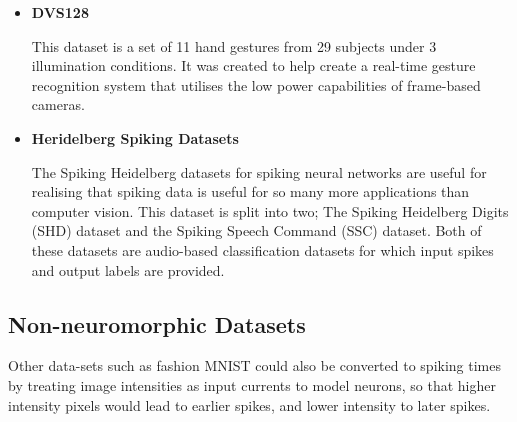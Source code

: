 \begin{itemize}
      \item \textbf{DVS128}

            This dataset is a set of 11 hand gestures from 29 subjects under 3 illumination conditions. It was created to help create a real-time gesture recognition system that utilises the low power capabilities of frame-based cameras\cite{DVS128}.
      \item \textbf{Heridelberg Spiking Datasets}

            The Spiking Heidelberg datasets for spiking neural networks\cite{SpikingHeidelberg} are useful for realising that spiking data is useful for so many more applications than computer vision. This dataset is split into two; The Spiking Heidelberg Digits (SHD) dataset and the Spiking Speech Command (SSC) dataset. Both of these datasets are audio-based classification datasets for which input spikes and output labels are provided.
\end{itemize}

\subsection{Non-neuromorphic Datasets}

Other data-sets such as fashion MNIST could also be converted to spiking times by treating image intensities as input currents to model neurons, so that higher intensity pixels would lead to earlier spikes, and lower intensity to later spikes.
